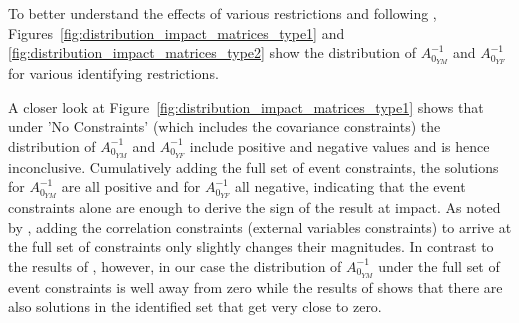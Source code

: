 \documentclass[a4paper,11pt,listof=nochaptergap,oneside,pointednumbers,bibtotoc,bigheadings,liststotoc,hidelinks]{scrbook}
\theoremstyle{mysatz}
\theoremstyle{mydefinition}
\theoremstyle{mytheorem}
\theoremstyle{mybemerkung}
\begin{document}
To better understand the effects of various restrictions and following \citet{ludvigsonetal:19}, Figures~\ref{fig:distribution_impact_matrices_type1} and \ref{fig:distribution_impact_matrices_type2} show the distribution of $A_{0_{YM}}^{-1}$ and $A_{0_{YF}}^{-1}$ for various identifying restrictions.

A closer look at Figure~\ref{fig:distribution_impact_matrices_type1} shows that under 'No Constraints' (which includes the covariance constraints) the distribution of $A_{0_{YM}}^{-1}$ and $A_{0_{YF}}^{-1}$ include positive and negative values and is hence inconclusive. Cumulatively adding the full set of event constraints, the solutions for $A_{0_{YM}}^{-1}$ are all positive and for $A_{0_{YF}}^{-1}$ all negative, indicating that the event constraints alone are enough to derive the sign of the result at impact. As noted by \citet{ludvigsonetal:19}, adding the correlation constraints (external variables constraints) to arrive at the full set of constraints only slightly changes their magnitudes. In contrast to the results of \citet{ludvigsonetal:19}, however, in our case the distribution of $A_{0_{YM}}^{-1}$ under the full set of event constraints is well away from zero while the results of \citet{ludvigsonetal:19} shows that there are also solutions in the identified set that get very close to zero.
\end{document}
